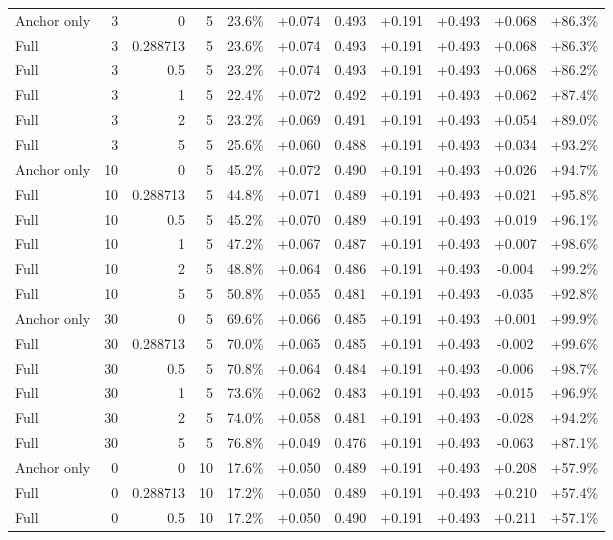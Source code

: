 \begin{table}[htbp]
\begin{tabular}{lrrrccccccc}
Anchor only & 3 & 0 & 5 & 23.6\% & +0.074 & 0.493 & +0.191 & +0.493 & +0.068 & +86.3\% \\
Full & 3 & 0.288713 & 5 & 23.6\% & +0.074 & 0.493 & +0.191 & +0.493 & +0.068 & +86.3\% \\
Full & 3 & 0.5 & 5 & 23.2\% & +0.074 & 0.493 & +0.191 & +0.493 & +0.068 & +86.2\% \\
Full & 3 & 1 & 5 & 22.4\% & +0.072 & 0.492 & +0.191 & +0.493 & +0.062 & +87.4\% \\
Full & 3 & 2 & 5 & 23.2\% & +0.069 & 0.491 & +0.191 & +0.493 & +0.054 & +89.0\% \\
Full & 3 & 5 & 5 & 25.6\% & +0.060 & 0.488 & +0.191 & +0.493 & +0.034 & +93.2\% \\
Anchor only & 10 & 0 & 5 & 45.2\% & +0.072 & 0.490 & +0.191 & +0.493 & +0.026 & +94.7\% \\
Full & 10 & 0.288713 & 5 & 44.8\% & +0.071 & 0.489 & +0.191 & +0.493 & +0.021 & +95.8\% \\
Full & 10 & 0.5 & 5 & 45.2\% & +0.070 & 0.489 & +0.191 & +0.493 & +0.019 & +96.1\% \\
Full & 10 & 1 & 5 & 47.2\% & +0.067 & 0.487 & +0.191 & +0.493 & +0.007 & +98.6\% \\
Full & 10 & 2 & 5 & 48.8\% & +0.064 & 0.486 & +0.191 & +0.493 & -0.004 & +99.2\% \\
Full & 10 & 5 & 5 & 50.8\% & +0.055 & 0.481 & +0.191 & +0.493 & -0.035 & +92.8\% \\
Anchor only & 30 & 0 & 5 & 69.6\% & +0.066 & 0.485 & +0.191 & +0.493 & +0.001 & +99.9\% \\
Full & 30 & 0.288713 & 5 & 70.0\% & +0.065 & 0.485 & +0.191 & +0.493 & -0.002 & +99.6\% \\
Full & 30 & 0.5 & 5 & 70.8\% & +0.064 & 0.484 & +0.191 & +0.493 & -0.006 & +98.7\% \\
Full & 30 & 1 & 5 & 73.6\% & +0.062 & 0.483 & +0.191 & +0.493 & -0.015 & +96.9\% \\
Full & 30 & 2 & 5 & 74.0\% & +0.058 & 0.481 & +0.191 & +0.493 & -0.028 & +94.2\% \\
Full & 30 & 5 & 5 & 76.8\% & +0.049 & 0.476 & +0.191 & +0.493 & -0.063 & +87.1\% \\
Anchor only & 0 & 0 & 10 & 17.6\% & +0.050 & 0.489 & +0.191 & +0.493 & +0.208 & +57.9\% \\
Full & 0 & 0.288713 & 10 & 17.2\% & +0.050 & 0.489 & +0.191 & +0.493 & +0.210 & +57.4\% \\
Full & 0 & 0.5 & 10 & 17.2\% & +0.050 & 0.490 & +0.191 & +0.493 & +0.211 & +57.1\% \\

\end{tabular}
\end{table}

